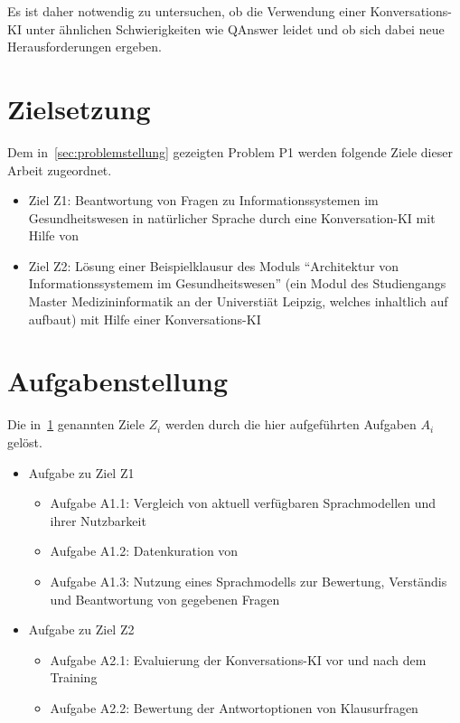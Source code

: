 Es ist daher notwendig zu untersuchen, ob die Verwendung einer Konversations-KI unter ähnlichen Schwierigkeiten wie QAnswer leidet und ob sich dabei neue Herausforderungen ergeben.

\section{Zielsetzung}\label{sec:zielsetzung}

Dem in~\ref{sec:problemstellung} gezeigten Problem P1 werden folgende Ziele dieser Arbeit zugeordnet.
\begin{itemize}
  \item Ziel Z1: Beantwortung von Fragen zu Informationssystemen im Gesundheitswesen in natürlicher Sprache durch eine Konversation-KI mit Hilfe von \citet{bb}
  \item Ziel Z2: Lösung einer Beispielklausur des Moduls \enquote{Architektur von Informationssystemem im Gesundheitswesen} (ein Modul des Studiengangs Master Medizininformatik an der Universtiät Leipzig, welches inhaltlich auf \citet{bb} aufbaut) mit Hilfe einer Konversations-KI
\end{itemize}

\section{Aufgabenstellung}

Die in~\ref{sec:zielsetzung} genannten Ziele $Z_i$ werden durch die hier aufgeführten Aufgaben $A_i$ gelöst.

\begin{itemize}
  \item Aufgabe zu Ziel Z1
  \begin{itemize}
    \item Aufgabe A1.1: Vergleich von aktuell verfügbaren Sprachmodellen und ihrer Nutzbarkeit
    \item Aufgabe A1.2: Datenkuration von \citet{bb}
    \item Aufgabe A1.3: Nutzung eines Sprachmodells zur Bewertung, Verständis und Beantwortung von gegebenen Fragen
  \end{itemize}
  \item Aufgabe zu Ziel Z2
  \begin{itemize}
    \item Aufgabe A2.1: Evaluierung der Konversations-KI vor und nach dem Training
    \item Aufgabe A2.2: Bewertung der Antwortoptionen von Klausurfragen
  \end{itemize}
\end{itemize}

